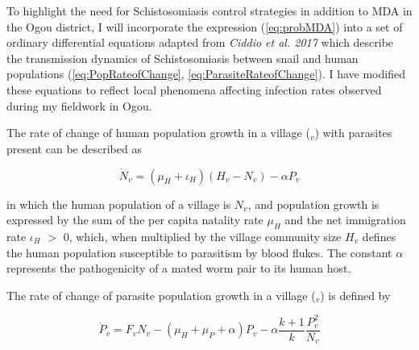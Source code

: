 \documentclass[12pt]{article}
\begin{document}
 
To highlight the need for Schistosomiasis control strategies in addition to MDA in the Ogou district, I will incorporate the expression (\ref{eq:probMDA}) into a set of ordinary differential equations adapted from \textit{Ciddio et al. 2017} which describe the transmission dynamics of Schistosomiasis between snail and human populations (\ref{eq:PopRateofChange}, \ref{eq:ParasiteRateofChange}). I have modified these equations to reflect local phenomena affecting infection rates observed during my fieldwork in Ogou. 
\bigskip


The rate of change of human population growth in a village ($_v$) with parasites present can be described as 

\begin{equation}\label{eq:PopRateofChange}
\dot{N}_v = (\mu_H+\iota_H)(H_v - N_v) - \alpha P_v
\end{equation}

 in which the human population of a village is $N_v$, and population growth is expressed by the sum of the per capita natality rate $\mu_H$ and the net immigration rate $\iota_H$ $>$ 0, which, when multiplied by the village community size $H_v$ defines the human population susceptible to parasitism by blood flukes. The constant $\alpha$ represents the pathogenicity of a mated worm pair to its human host. 
 \bigskip
 
 The rate of change of parasite population growth in a village ($_v$) is defined by
 
 \begin{equation}\label{eq:ParasiteRateofChange}
 \dot{P}_v = F_v N_v - (\mu_H + \mu_P + \alpha)P_v - \alpha \frac{k +1 }{k}\frac{P_v^2}{N_v}
 \end{equation}
\end{document}
